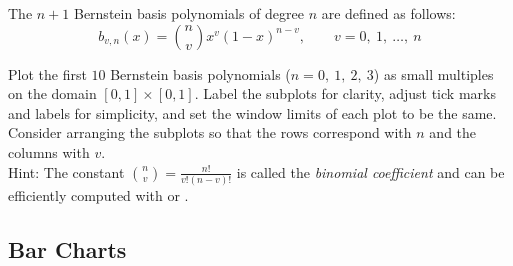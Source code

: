 
\begin{problem} %
The $n+1$ Bernstein basis polynomials of degree $n$ are defined as follows:
\[b_{v,n}(x) = {{n} \choose {v}} x^v (1-x)^{n-v},\qquad v = 0,\ 1,\ \ldots,\ n\]

Plot the first $10$ Bernstein basis polynomials ($n = 0,\ 1,\ 2,\ 3$) as small multiples on the domain $[0,1] \times [0,1]$.
Label the subplots for clarity, adjust tick marks and labels for simplicity, and set the window limits of each plot to be the same.
Consider arranging the subplots so that the rows correspond with $n$ and the columns with $v$.
\\Hint: The constant ${{n} \choose {v}} = \frac{n!}{v!(n-v)!}$ is called the \emph{binomial coefficient} and can be efficiently computed with  or .
\end{problem}

\subsection*{Bar Charts} %


